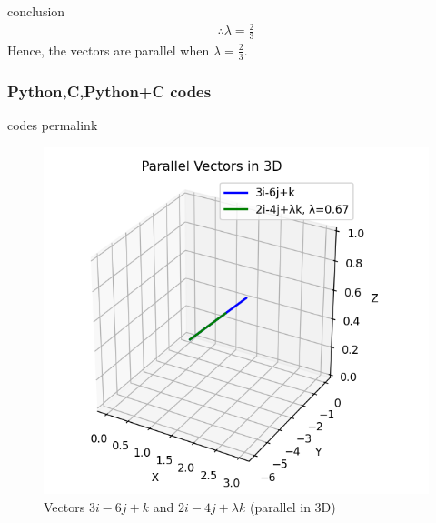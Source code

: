 \documentclass{beamer}
\begin{document}
\begin{frame}{conclusion}
    \begin{align}
    \therefore \lambda = \frac{2}{3}
\end{align}
Hence, the vectors are parallel when $\lambda = \frac{2}{3}$.
\end{frame}

\begin{frame}[fragile]
\frametitle{Python,C,Python+C codes}
codes permalink
\end{frame}

\begin{frame}
\begin{figure}
    \centering
    \includegraphics[width=0.5\columnwidth]{figs/fig.png}
    \caption{Vectors $3i-6j+k$ and $2i-4j+\lambda k$ (parallel in 3D)}
    \label{fig:Vectors}
\end{figure}
\end{frame}
\end{document}
